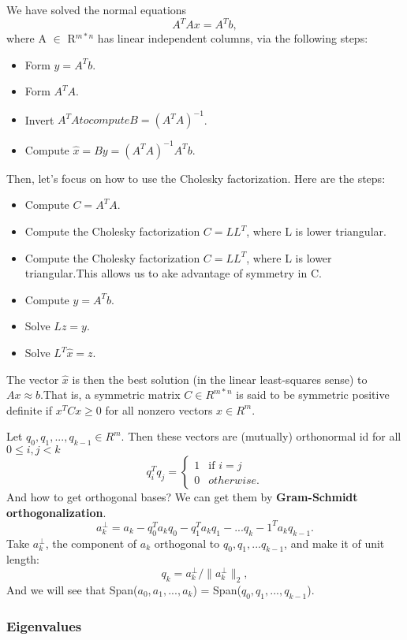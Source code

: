 \documentclass{article}
\begin{document}

We have solved the normal equations \[ A^TAx = A^Tb,\] where A $\in$ R$^{m*n}$ has linear independent columns, via the following steps:
\begin{itemize}
\item
Form $y = A^Tb$.
\item
Form $A^TA$.
\item
Invert $A^TA to compute B = (A^TA)^{-1}$.
\item
Compute $\hat{x} = By = (A^TA)^{-1}A^Tb$.
\end{itemize}
Then, let's focus on how to use the Cholesky factorization. Here are the steps:
\begin{itemize}
\item
Compute $C = A^TA$.
\item
Compute the Cholesky factorization $C = LL^T$, where L is lower triangular.
\item
Compute the Cholesky factorization $C = LL^T$, where L is lower triangular.This allows us to ake advantage of symmetry in C.
\item
Compute $y = A^Tb$.
\item
Solve $Lz = y$.
\item
Solve $L^T\hat{x} = z$.
\end{itemize}
The vector $\hat{x}$ is then the best solution (in the linear least-squares sense) to $Ax\approx b$.That is, a symmetric matrix $C \in R^{m*n}$ is said to be symmetric positive definite if $x^TCx \geq 0$ for all nonzero vectors $x \in R^m.$

Let $q_0,q_1,...,q_{k-1} \in R^{m}.$ Then these vectors are (mutually) orthonormal id for all $0 \leq i,j < k$ \[ q_i^Tq_j = \left\{ \begin{array}{ll}
1 & \mbox{if $i = j$}\\
0 & \mbox{$otherwise$}.\end{array} \right. \]
And how to get orthogonal bases? We can get them by \textbf{Gram-Schmidt orthogonalization}.\[a_k^{\perp} = a_k - q_0^Ta_kq_0 - q_1^Ta_kq_1 - ... q_k-1^Ta_kq_{k-1}.\] Take $a_k^{\perp}$, the component of $a_k$ orthogonal to $q_0, q_1,...q_{k-1}$, and make it of unit length:\[q_k = a_k^\perp/\parallel a_k^{\perp}\parallel_2,\] And we will see that Span(${a_0, a_1,..., a_k}$) = Span(${q_0, q_1,..., q_{k-1}}$).

\subsubsection{Eigenvalues}
\end{document}

